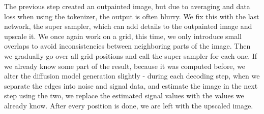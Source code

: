 The previous step created an outpainted image, but due to averaging and data loss when using the tokenizer, the output is often blurry. We fix this with the last network, the super sampler, which can add details to the outpainted image and upscale it. We once again work on a grid, this time, we only introduce small overlaps to avoid inconsistencies between neighboring parts of the image. Then we gradually go over all grid positions and call the super sampler for each one. If we already know some part of the result, because it was computed before, we alter the diffusion model generation slightly - during each decoding step, when we separate the edges into noise and signal data, and estimate the image in the next step using the two, we replace the estimated signal values with the values we already know. After every position is done, we are left with the upscaled image.
